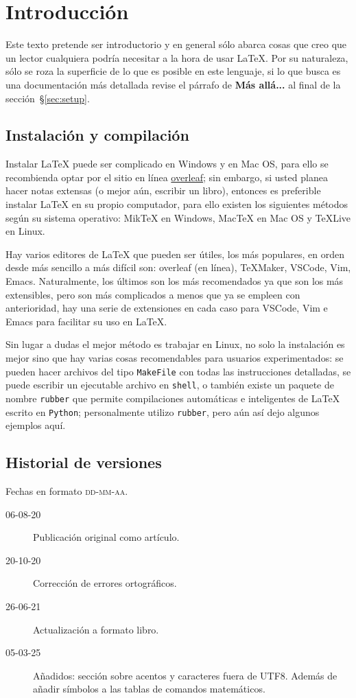 \documentclass[intro-breve-latex.tex]{subfiles}
\begin{document}
\chapter{Introducción}
Este texto pretende ser introductorio y en general sólo abarca cosas que creo que un lector cualquiera podría necesitar a la hora de usar \LaTeX{}. Por su naturaleza, sólo se roza la superficie de lo que es posible en este lenguaje, si lo que busca es una documentación más detallada revise el párrafo de \textbf{Más allá...} al final de la sección~\S\ref{sec:setup}.

\section*{Instalación y compilación}
Instalar \LaTeX{} puede ser complicado en Windows y en Mac OS, para ello se recombienda optar por el sitio en línea
\href{https://www.overleaf.com/}{\sffamily\color{newgreen}overleaf};
sin embargo, si usted planea hacer notas extensas (o mejor aún, escribir un libro), entonces es preferible instalar \LaTeX{} en su propio computador,
para ello existen los siguientes métodos según su sistema operativo:
Mik\TeX{} en Windows, Mac\TeX{} en Mac OS y \TeX{}Live en Linux.

Hay varios editores de \LaTeX{} que pueden ser útiles, los más populares, en orden desde más sencillo a más difícil son:
overleaf (en línea), \TeX{}Maker, VSCode, Vim, Emacs.
Naturalmente, los últimos son los más recomendados ya que son los más extensibles, pero son más complicados a menos que ya se empleen con anterioridad,
hay una serie de extensiones en cada caso para VSCode, Vim e Emacs para facilitar su uso en \LaTeX{}.

Sin lugar a dudas el mejor método es trabajar en Linux, no solo la instalación es mejor sino que hay varias cosas recomendables para usuarios
experimentados:
se pueden hacer archivos del tipo \texttt{MakeFile} con todas las instrucciones detalladas,
se puede escribir un ejecutable archivo en \texttt{shell},
o también existe un paquete de nombre \texttt{rubber} que permite compilaciones automáticas e inteligentes de \LaTeX{} escrito en \texttt{Python};
personalmente utilizo \texttt{rubber}, pero aún así dejo algunos ejemplos aquí.

\section*{Historial de versiones}
Fechas en formato \textsc{dd-mm-aa}. 
\begin{description}
	\item[06-08-20] Publicación original como artículo.
	\item[20-10-20] Corrección de errores ortográficos.
	\item[26-06-21] Actualización a formato libro.
	\item[05-03-25] Añadidos: sección sobre acentos y caracteres fuera de UTF8.
		Además de añadir símbolos a las tablas de comandos matemáticos.
\end{description}
\end{document}
